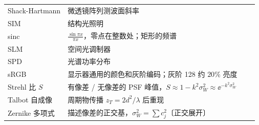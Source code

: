 {\begin{longtable}{@{}P{3.45cm}P{11.75cm}>{\raggedleft\arraybackslash}p{0.72cm}>{\raggedleft\arraybackslash}p{0.72cm}@{}}
Shack-Hartmann & 微透镜阵列测波面斜率 &  & \pageref{sec:rayaberr}\\
SIM & 结构光照明 & \pageref{sec:p-spfreq} & \pageref{sec:sim}\\
sinc & $\frac{\sin\pi x}{\pi x}$，零点在整数处；矩形的频谱 & \pageref{sec:p-diff} & \pageref{fml:pairs}\\
SLM & 空间光调制器 & \pageref{sec:p-lensft} & \pageref{sec:linphase}\\
SPD & 光谱功率分布 &  & \pageref{sec:photounits}\\
sRGB & 显示器通用的颜色和灰阶编码；灰阶 128 约 $20\%$ 亮度 & \pageref{sec:p-eye} & \pageref{sec:gammacalc}\\
Strehl 比 $S$ & 有像差 / 无像差的 PSF 峰值，$S\approx1-k^2\sigma_W^2\approx\ee^{-k^2\sigma_W^2}$ & \pageref{sec:p-aberr} & \pageref{sec:strehl}\\
Talbot 自成像 & 周期物传播 $z_T=2d^2/\lambda$ 后重现 & \pageref{sec:p-diff} & \pageref{ex:talbot}\\
Zernike 多项式 & 描述像差的正交基，$\sigma_W^2=\sum c_j^2$〔正交展开〕 &  & \pageref{sec:zernike}\\
\end{longtable}}

